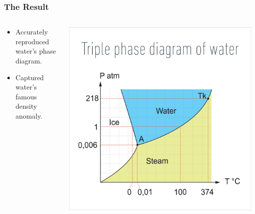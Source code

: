 \begin{frame}
    \frametitle{The Result}
    \begin{columns}[T]
        \begin{column}{0.5\textwidth}
            \vspace{2cm}
            \begin{itemize}
                \item Accurately reproduced water's phase diagram.
                \item Captured water's famous density anomaly.
            \end{itemize}
        \end{column}
        \begin{column}{0.5\textwidth}
            \includegraphics[width=\textwidth]{images/CCSD(T)2.jpg}
        \end{column}
    \end{columns}
\end{frame}


